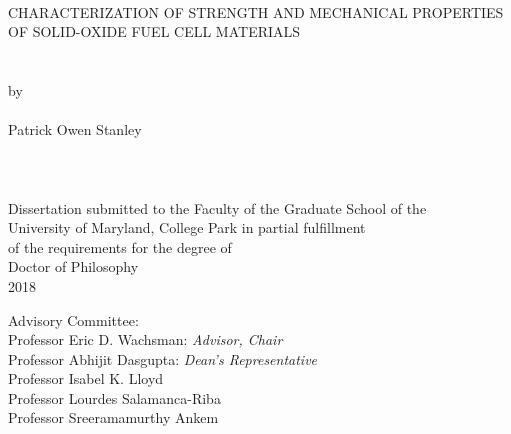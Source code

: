 

\thispagestyle{empty}
\hbox{\ }
\vspace{1in}
\renewcommand{\baselinestretch}{1}
\small\normalsize
\begin{center}

\large{{CHARACTERIZATION OF STRENGTH AND MECHANICAL PROPERTIES OF SOLID-OXIDE FUEL CELL MATERIALS}}\\
\ \\
\ \\
\large{by} \\
\ \\
\large{Patrick Owen Stanley}%
\ \\
\ \\
\ \\
\ \\
\normalsize
Dissertation submitted to the Faculty of the Graduate School of the \\
University of Maryland, College Park in partial fulfillment \\
of the requirements for the degree of \\
Doctor of Philosophy \\
2018
\end{center}

\vspace{7.5em}

\noindent Advisory Committee: \\
Professor Eric D. Wachsman: \textit{Advisor, Chair} \\
Professor Abhijit Dasgupta: \textit{Dean's Representative} \\
Professor Isabel K. Lloyd \\
Professor Lourdes Salamanca-Riba \\
Professor Sreeramamurthy Ankem
